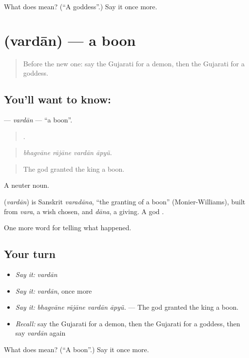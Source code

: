 \begin{tcolorbox}[breakable,colback=teal!4,colframe=teal!35!black,title={Before you move on}]
What does  mean? (\textquotedblleft{}A goddess\textquotedblright{}.) Say it once more.
\end{tcolorbox}
\section[\texorpdfstring{\gu{વરદાન} (vardān)}{વરદાન (vardān)}]{ (vardān) — a boon}

\label{lesson:GU-C332-vardan}



\begin{quote}
Before the new one: say the Gujarati for a demon, then the Gujarati for a goddess.
\end{quote}

\subsection*{You'll want to know: }
\textbf{} — \emph{vardān} — \textquotedblleft{}a boon\textquotedblright{}.

\begin{quote}
   .
\end{quote}

\begin{quote}
\emph{bhagvāne rājāne vardān āpyũ.}
\end{quote}

\begin{quote}
The god granted the king a boon.
\end{quote}

A neuter noun.

\begin{cousinweb}
\textbf{} (\emph{vardān}) is Sanskrit \emph{varadāna}, \textquotedblleft{}the granting of a boon\textquotedblright{} (Monier-Williams), built from \emph{vara}, a wish chosen, and \emph{dāna}, a giving. A god \textbf{  }.
\end{cousinweb}

\begin{grammarlens}[title={What you've built}]
One more word for telling what happened.
\end{grammarlens}

\subsection*{Your turn}
\begin{itemize}
\raggedright
  \item \emph{Say it:} \emph{vardān}
  \item \emph{Say it:} \emph{vardān}, once more
  \item \emph{Say it:} \emph{bhagvāne rājāne vardān āpyũ.} — The god granted the king a boon.
  \item \emph{Recall:} say the Gujarati for a demon, then the Gujarati for a goddess, then say \emph{vardān} again
\end{itemize}

\begin{tcolorbox}[breakable,colback=teal!4,colframe=teal!35!black,title={Before you move on}]
What does  mean? (\textquotedblleft{}A boon\textquotedblright{}.) Say it once more.
\end{tcolorbox}
